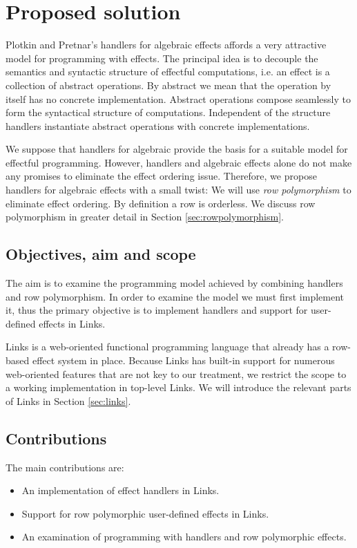 \section{Proposed solution}\label{sec:proposedsolution}
Plotkin and Pretnar's handlers for algebraic effects \cite{Plotkin2013} affords a very attractive model for programming with effects. The principal idea is to decouple the semantics and syntactic structure of effectful computations, i.e. an effect is a collection of abstract operations. By abstract we mean that the operation by itself has no concrete implementation. Abstract operations compose seamlessly to form the syntactical structure of computations. Independent of the structure handlers instantiate abstract operations with concrete implementations.

We suppose that handlers for algebraic provide the basis for a suitable model for effectful programming. However, handlers and algebraic effects alone do not make any promises to eliminate the effect ordering issue. Therefore, we propose handlers for algebraic effects with a small twist: We will use \emph{row polymorphism} to eliminate effect ordering. By definition a row is orderless. We discuss row polymorphism in greater detail in Section \ref{sec:rowpolymorphism}.

\subsection{Objectives, aim and scope}
The aim is to examine the programming model achieved by combining handlers and row polymorphism.
In order to examine the model we must first implement it, thus the primary objective is to implement handlers and support for user-defined effects in Links.

Links is a web-oriented functional programming language that already has a row-based effect system in place. Because Links has built-in support for numerous web-oriented features that are not key to our treatment, we restrict the scope to a working implementation in top-level Links. We will introduce the relevant parts of Links in Section \ref{sec:links}.

\subsection{Contributions}
The main contributions are:
\begin{itemize}
  \item An implementation of effect handlers in Links.
  \item Support for row polymorphic user-defined effects in Links.
  \item An examination of programming with handlers and row polymorphic effects.
\end{itemize}